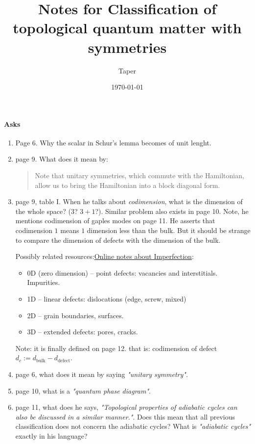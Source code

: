 \documentclass{article}
\title{Notes for Classification of topological quantum matter with
symmetries}
\date{\today}
\author{Taper}
\begin{document}
\maketitle
{}
\tableofcontents
\paragraph{Asks}
\begin{enumerate}
    \item Page 6. Why the scalar in Schur's lemma becomes of unit lenght.
    \item page 9. What does it mean by:
        \begin{quote}
            Note that unitary symmetries, which commute with the
            Hamiltonian, allow us to bring the Hamiltonian into a
            block diagonal form.
        \end{quote}
    \item page 9, table I. When he talks about \textit{codimension},
        what is the dimension of the whole space? ($3$? $3+1$?).
        Similar problem also exists in page 10.
        Note, he mentions codimension of gaples modes on page 11. He
        asserts that codimension $1$ means $1$ dimension less than the
        bulk. But it should be strange to compare the dimension of
        defects with the dimension of the bulk.

        Possibly related
        resources:\href{http://www.virginia.edu/bohr/mse209/chapter4.htm}
        {Online notes about Imperfection}:
        \begin{itemize}
            \item $0$D (zero dimension) – point defects: vacancies and
                interstitials. Impurities.
            \item 1D – linear defects: dislocations (edge, screw,
                mixed) 
            \item 2D – grain boundaries, surfaces.  
            \item 3D – extended defects: pores, cracks.
        \end{itemize}

        Note: it is finally defined on page 12. that is:
        codimension of defect $d_c:= d_\text{bulk} - d_\text{defect}$.
    \item page 6, what does it mean by saying \textit{"unitary
        symmetry"}.
    \item page 10, what is a \textit{"quantum phase diagram"}.
    \item page 11, what does he says, \textit{"Topological properties of
        adiabatic cycles can also be discussed in a similar manner."}.
        Does this mean that all previous classification does not
        concern the adiabatic cycles? What is \textit{"adiabatic
        cycles"} exactly in his language?


\end{enumerate}
\end{document}
